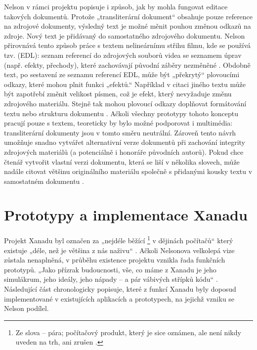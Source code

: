 \label{p:xana:edl}
Nelson v rámci projektu  popisuje i způsob, jak by mohla fungovat editace takových dokumentů. Protože „transliterární dokument“ obsahuje pouze reference na zdrojové dokumenty, výsledný text je možné měnit pouhou změnou odkazů na zdroje. Nový text je přidávaný do samostatného zdrojového dokumentu. Nelson přirovnává tento způsob práce s textem nelineárnímu střihu filmu, kde se používá tzv.  (EDL): seznam referencí do zdrojových souborů videa se seznamem úprav (např. efekty, přechody), které zachovávají původní záběry nezměněné \autocites[11]{Nelson1999b}{Translit}. Obdobně text, po sestavení ze seznamu referencí EDL, může být „překrytý“ plovoucími odkazy, které mohou plnit funkci „efektů.“ Například v citaci jiného textu může být zapotřebí změnit velikost písmen, což je efekt, který nevyžaduje změnu zdrojového materiálu. Stejně tak mohou plovoucí odkazy doplňovat formátování textu nebo strukturu dokumentu \autocites[4/53--4/55]{LitMachines}{Translit}{Nelson:XanaduSpace}. Ačkoli všechny prototypy tohoto konceptu pracují pouze s textem, teoreticky by bylo možné podporovat i multimédia: transliterární dokumenty jsou v tomto směru neutrální. Zároveň tento návrh umožňuje snadno vytvářet alternativní verze dokumentů při zachování integrity zdrojových materiálů (a potenciálně i honoráře původních autorů). Pokud chce čtenář vytvořit vlastní verzi dokumentu, která se liší v několika slovech, může nadále citovat většinu originálního materiálu společně s přidanými kousky textu v samostatném dokumentu \autocite[2/45--2/46]{LitMachines}.


\section{Prototypy a implementace Xanadu}
\label{sec:xana:proto}

Projekt Xanadu byl označen za „nejdéle běžící \footnote{Ze slova  -- pára; počítačový produkt, který je sice oznámen, ale není nikdy uveden na trh, ani zrušen \autocite{wiki:Vaporware}.} v dějinách počítačů“ \autocite{Wolf1995} který existuje „déle, než je většina z nás naživu“ \autocite{XanaLight}.
Ačkoli Nelsonova velkolepá vize zůstala nenaplněná, v průběhu existence projektu vznikla řada funkčních prototypů. „Jako přízrak budoucnosti, vše, co máme z Xanadu je jeho simulákrum, jeho ideály, jeho nápady -- a pár vábivých střípků kódu“ \autocite[68]{Barnet2014}. Následující část chronologicky popisuje, které z funkcí Xanadu byly doposud implementované v existujících aplikacích a prototypech, na jejichž vzniku se Nelson podílel.

